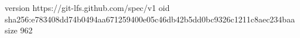 version https://git-lfs.github.com/spec/v1
oid sha256:e783408dd74b0494aa671259400e05c46db42b5dd0bc9326c1211c8aec234baa
size 962
